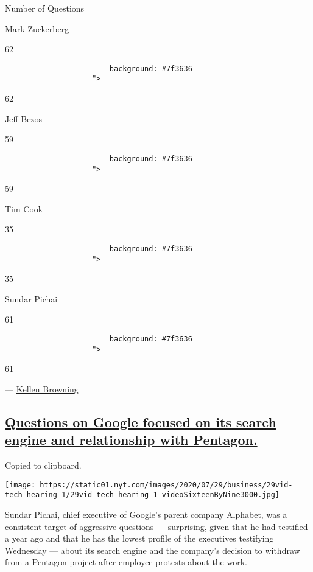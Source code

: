 Number of Questions

Mark Zuckerberg

62

\begin{verbatim}
                        background: #7f3636
                    ">
\end{verbatim}

62

Jeff Bezos

59

\begin{verbatim}
                        background: #7f3636
                    ">
\end{verbatim}

59

Tim Cook

35

\begin{verbatim}
                        background: #7f3636
                    ">
\end{verbatim}

35

Sundar Pichai

61

\begin{verbatim}
                        background: #7f3636
                    ">
\end{verbatim}

61

--- \href{https://www.nytimes.com/by/kellen-browning}{Kellen Browning}

\hypertarget{questions-on-google-focused-on-its-search-engine-and-relationship-with-pentagon}{%
\subsection{\texorpdfstring{\protect\hyperlink{questions-on-google-focused-on-its-search-engine-and-relationship-with-pentagon}{Questions
on Google focused on its search engine and relationship with
Pentagon.}}{Questions on Google focused on its search engine and relationship with Pentagon.}}\label{questions-on-google-focused-on-its-search-engine-and-relationship-with-pentagon}}

Copied to clipboard.

\texttt{[image: https://static01.nyt.com/images/2020/07/29/business/29vid-tech-hearing-1/29vid-tech-hearing-1-videoSixteenByNine3000.jpg]}

Sundar Pichai, chief executive of Google's parent company Alphabet, was
a consistent target of aggressive questions --- surprising, given that
he had testified a year ago and that he has the lowest profile of the
executives testifying Wednesday --- about its search engine and the
company's decision to withdraw from a Pentagon project after employee
protests about the work.

